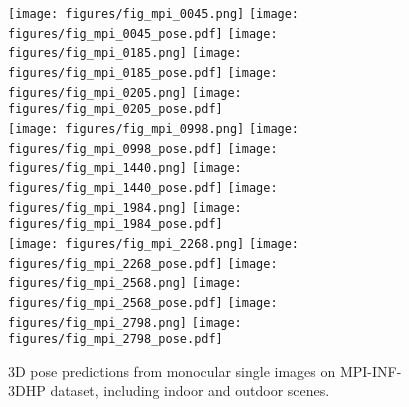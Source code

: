 \documentclass[10pt,twocolumn,letterpaper]{article}
\begin{document}
\begin{figure*}[!h]
  \centering
  \texttt{[image: figures/fig\_mpi\_0045.png]}
  \texttt{[image: figures/fig\_mpi\_0045\_pose.pdf]}\hspace{0.3cm}
  \texttt{[image: figures/fig\_mpi\_0185.png]}
  \texttt{[image: figures/fig\_mpi\_0185\_pose.pdf]}\hspace{0.3cm}
  \texttt{[image: figures/fig\_mpi\_0205.png]}
  \texttt{[image: figures/fig\_mpi\_0205\_pose.pdf]}\\\vspace{0.01cm}
  \texttt{[image: figures/fig\_mpi\_0998.png]}
  \texttt{[image: figures/fig\_mpi\_0998\_pose.pdf]}\hspace{0.3cm}
  \texttt{[image: figures/fig\_mpi\_1440.png]}
  \texttt{[image: figures/fig\_mpi\_1440\_pose.pdf]}\hspace{0.3cm}
  \texttt{[image: figures/fig\_mpi\_1984.png]}
  \texttt{[image: figures/fig\_mpi\_1984\_pose.pdf]}\\\vspace{0.01cm}
  \texttt{[image: figures/fig\_mpi\_2268.png]}
  \texttt{[image: figures/fig\_mpi\_2268\_pose.pdf]}\hspace{0.3cm}
  \texttt{[image: figures/fig\_mpi\_2568.png]}
  \texttt{[image: figures/fig\_mpi\_2568\_pose.pdf]}\hspace{0.3cm}
  \texttt{[image: figures/fig\_mpi\_2798.png]}
  \texttt{[image: figures/fig\_mpi\_2798\_pose.pdf]}\\\vspace{0.01cm}
  \caption{
    3D pose predictions from monocular single images on MPI-INF-3DHP dataset,
    including indoor and outdoor scenes.
  }
  \label{fig:predictions_mpi}
\end{figure*}
\end{document}
